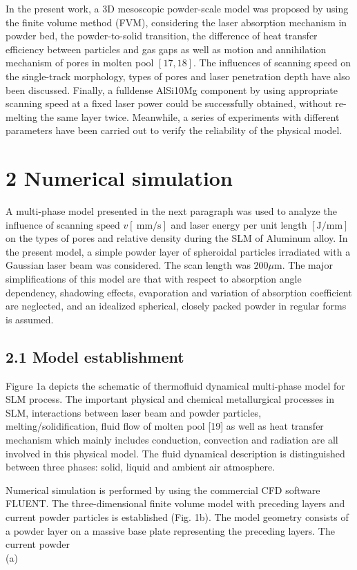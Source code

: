 \documentclass[10pt]{article}
\begin{document}
In the present work, a 3D mesoscopic powder-scale model was proposed by using the finite volume method (FVM), considering the laser absorption mechanism in powder bed, the powder-to-solid transition, the difference of heat transfer efficiency between particles and gas gaps as well as motion and annihilation mechanism of pores in molten pool $[17,18]$. The influences of scanning speed on the single-track morphology, types of pores and laser penetration depth have also been discussed. Finally, a fulldense AlSi10Mg component by using appropriate scanning speed at a fixed laser power could be successfully obtained, without re-melting the same layer twice. Meanwhile, a series of experiments with different parameters have been carried out to verify the reliability of the physical model.

\section*{2 Numerical simulation}
A multi-phase model presented in the next paragraph was used to analyze the influence of scanning speed $v[\mathrm{~mm} / \mathrm{s}]$ and laser energy per unit length $[\mathrm{J} / \mathrm{mm}]$ on the types of pores and relative density during the SLM of Aluminum alloy. In the present model, a simple powder layer of spheroidal particles irradiated with a Gaussian laser beam was considered. The scan length was $200 \mu \mathrm{m}$. The major simplifications of this model are that with respect to absorption angle dependency, shadowing effects, evaporation and variation of absorption coefficient are neglected, and an idealized spherical, closely packed powder in regular forms is assumed.

\subsection*{2.1 Model establishment}
Figure 1a depicts the schematic of thermofluid dynamical multi-phase model for SLM process. The important physical and chemical metallurgical processes in SLM, interactions between laser beam and powder particles, melting/solidification, fluid flow of molten pool [19] as well as heat transfer mechanism which mainly includes conduction, convection and radiation are all involved in this physical model. The fluid dynamical description is distinguished between three phases: solid, liquid and ambient air atmosphere.

Numerical simulation is performed by using the commercial CFD software FLUENT. The three-dimensional finite volume model with preceding layers and current powder particles is established (Fig. 1b). The model geometry consists of a powder layer on a massive base plate representing the preceding layers. The current powder\\
(a)
\end{document}
